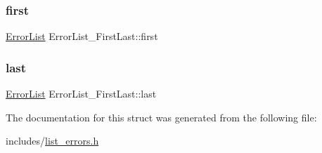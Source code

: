 \subsubsection{\texorpdfstring{first}{first}}
{\footnotesize\ttfamily \hyperlink{list__errors_8h_a90522ae3e839b4beec367e58bc649808}{Error\+List} Error\+List\+\_\+\+First\+Last\+::first}

\mbox{\label{structErrorList__FirstLast_ab1810567d2d39e9b6784a3b04cde8492}} 
\subsubsection{\texorpdfstring{last}{last}}
{\footnotesize\ttfamily \hyperlink{list__errors_8h_a90522ae3e839b4beec367e58bc649808}{Error\+List} Error\+List\+\_\+\+First\+Last\+::last}



The documentation for this struct was generated from the following file\+:\begin{DoxyCompactItemize}
\item 
includes/\hyperlink{list__errors_8h}{list\+\_\+errors.\+h}\end{DoxyCompactItemize}
